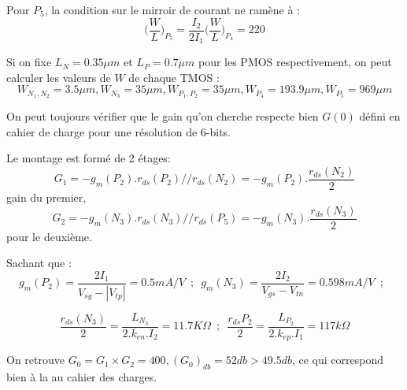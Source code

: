 \documentclass[11pt]{article}
\begin{document}
Pour $P_5$, la condition sur le mirroir de courant ne ram\`ene \`a :
\[
\bigg( \frac{W}{L} \bigg)_{P_{5}} = \frac{I_2}{2 I_1} \bigg( \frac{W}{L} \bigg)_{P_{4}} = 220
\]

Si on fixe $L_N = 0.35 \mu m$ et $L_P = 0.7 \mu m$ pour les PMOS respectivement, on peut calculer les
valeurs de $W$ de chaque TMOS :
\[
W_{N_1,N_2} = 3.5 \mu m, W_{N_3} = 35 \mu m, W_{P_1, P_2} = 35 \mu m, W_{P_4} = 193.9 \mu m, W_{P_5} = 969 \mu m
\]

On peut toujours v\'erifier que le gain qu'on cherche respecte bien $G(0)$ d\'efini en cahier de charge
pour une r\'esolution de 6-bits.

Le montage est form\'e de 2 \'etages:
\[
G_1 = - g_m (P_2).r_{ds}(P_2)//r_{ds}(N_2) = -g_m(P_2).\frac{r_{ds}(N_2)}{2}
\]
gain du premier,
\[
G_2 = - g_m (N_3).r_{ds}(N_3)//r_{ds}(P_5) = -g_m(N_3).\frac{r_{ds}(N_3)}{2}
\]
pour le deuxi\`eme.

Sachant que :
\[
g_m(P_2) = \frac{2I_1}{V_{sg} - | V_{tp} | } = 0.5  mA/V
\phantom{3}
;
\phantom{3}
g_m(N_3) = \frac{2 I_2}{V_{gs} - V_{tn}} = 0.598 mA/V
\phantom{3}
;
\phantom{3}
\]

\[
\frac{r_{ds}(N_3)}{2} = \frac{L_{N_{3}}}{2.k_{en}.I_{2}} = 11.7 K\Omega
\phantom{3}
;
\phantom{3}
\frac{r_{ds}{P_2}}{2} = \frac{L_{P_{2}}}{2.k_{ep}.I_{1}} = 117 k\Omega
\]

On retrouve $G_0 = G_1 \times G_2 = 400, (G_0)_{db} = 52 db > 49.5 db$, ce qui correspond bien \`a la
au cahier des charges.


\clearpage

\end{document}
